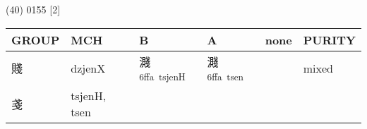 \documentclass[14pt,a4paper]{scrartcl}
\begin{document}
(40) 0155 {[}2{]}

\begin{longtable}[c]{@{}llllll@{}}
\toprule
\begin{minipage}[b]{0.14\columnwidth}\raggedright\strut
GROUP
\strut\end{minipage} &
\begin{minipage}[b]{0.14\columnwidth}\raggedright\strut
MCH
\strut\end{minipage} &
\begin{minipage}[b]{0.14\columnwidth}\raggedright\strut
B
\strut\end{minipage} &
\begin{minipage}[b]{0.14\columnwidth}\raggedright\strut
A
\strut\end{minipage} &
\begin{minipage}[b]{0.14\columnwidth}\raggedright\strut
none
\strut\end{minipage} &
\begin{minipage}[b]{0.14\columnwidth}\raggedright\strut
PURITY
\strut\end{minipage}\tabularnewline
\midrule
\endhead
\begin{minipage}[t]{0.14\columnwidth}\raggedright\strut
賤
\strut\end{minipage} &
\begin{minipage}[t]{0.14\columnwidth}\raggedright\strut
dzjenX
\strut\end{minipage} &
\begin{minipage}[t]{0.14\columnwidth}\raggedright\strut
濺\textsuperscript{6ffa~tsjenH}
\strut\end{minipage} &
\begin{minipage}[t]{0.14\columnwidth}\raggedright\strut
濺\textsuperscript{6ffa~tsen}
\strut\end{minipage} &
\begin{minipage}[t]{0.14\columnwidth}\raggedright\strut
\strut\end{minipage} &
\begin{minipage}[t]{0.14\columnwidth}\raggedright\strut
mixed
\strut\end{minipage}\tabularnewline
\begin{minipage}[t]{0.14\columnwidth}\raggedright\strut
戔
\strut\end{minipage} &
\begin{minipage}[t]{0.14\columnwidth}\raggedright\strut
tsjenH, tsen
\strut\end{minipage} &
\begin{minipage}[t]{0.14\columnwidth}\raggedright\strut

\end{minipage}
\end{longtable}
\end{document}
